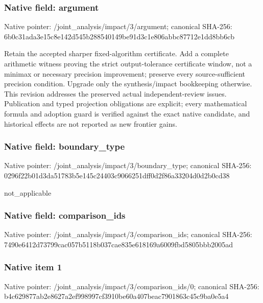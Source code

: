 \documentclass[10pt,a4paper]{article}
\begin{document}
\subsubsection{Native field: argument}
Native pointer: /joint\_\allowbreak{}analysis/impact/3/argument; canonical SHA-256: 6b0c31ada3e15c8e142d545b288540149be91d3c1e806abbc87712e1dd8bb6cb

\begingroup\raggedright\sloppy Retain the accepted sharper fixed-algorithm certificate. Add a complete arithmetic witness proving the strict output-tolerance certificate window,\allowbreak{} not a minimax or necessary precision improvement;\allowbreak{} preserve every source-sufficient precision condition. Upgrade only the synthesis/\allowbreak{}impact bookkeeping otherwise. This revision addresses the preserved actual independent-review issues. Publication and typed projection obligations are explicit;\allowbreak{} every mathematical formula and adoption guard is verified against the exact native candidate,\allowbreak{} and historical effects are not reported as new frontier gains.\par\endgroup

\subsubsection{Native field: boundary\_\allowbreak{}type}
Native pointer: /joint\_\allowbreak{}analysis/impact/3/boundary\_\allowbreak{}type; canonical SHA-256: 0296f22b01d3da51783b5e145c24403c9066251dff0d2f86a33204d0d2b0cd38

\begingroup\raggedright\sloppy not\_\allowbreak{}applicable\par\endgroup

\subsubsection{Native field: comparison\_\allowbreak{}ids}
Native pointer: /joint\_\allowbreak{}analysis/impact/3/comparison\_\allowbreak{}ids; canonical SHA-256: 7490e6412d73799cac057b5118b037cae835e618169a6009fbd5805bbb2005ad

\subsubsection{Native item 1}
Native pointer: /joint\_\allowbreak{}analysis/impact/3/comparison\_\allowbreak{}ids/0; canonical SHA-256: b4c629877ab2e8627a2ef998997cf3910be60a407beac7901863c45c9ba0e5a4
\end{document}
